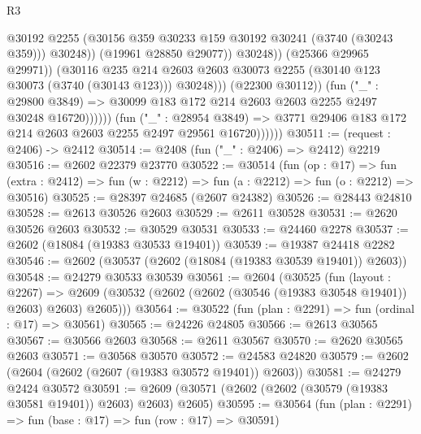 \begin{lexlean}{R3}
\begin{coremodule}
                                          @30192
                                          @2255
                                          (@30156
                                            @359
                                            @30233
                                            @159
                                            @30192
                                            @30241
                                            (@3740 (@30243 @359)))
                                          @30248))
                                      (@19961 @28850 @29077))
                                    @30248))
                                (@25366 @29965 @29971))
                              (@30116
                                @235
                                @214
                                @2603
                                @2603
                                @30073
                                @2255
                                (@30140 @123 @30073 (@3740 (@30143 @123)))
                                @30248)))
                          (@22300 @30112))
                        (fun ("_" : @29800 @3849) =>
                        @30099 @183 @172 @214 @2603 @2603 @2255 @2497 @30248 @16720))))))
              (fun ("_" : @28954 @3849) =>
              @3771 @29406 @183 @172 @214 @2603 @2603 @2255 @2497 @29561 @16720))))))
@30511 := (request : @2406) -> @2412
@30514 := @2408 (fun ("_" : @2406) => @2412) @2219
@30516 := @2602 @22379 @23770
@30522 := @30514
    (fun (op : @17) =>
    fun (extra : @2412) => fun (w : @2212) => fun (a : @2212) => fun (o : @2212) => @30516)
@30525 := @28397 @24685 (@2607 @24382)
@30526 := @28443 @24810
@30528 := @2613 @30526 @2603
@30529 := @2611 @30528
@30531 := @2620 @30526 @2603
@30532 := @30529 @30531
@30533 := @24460 @2278
@30537 := @2602 (@18084 (@19383 @30533 @19401))
@30539 := @19387 @24418 @2282
@30546 := @2602 (@30537 (@2602 (@18084 (@19383 @30539 @19401)) @2603))
@30548 := @24279 @30533 @30539
@30561 := @2604
    (@30525
      (fun (layout : @2267) =>
      @2609 (@30532 (@2602 (@2602 (@30546 (@19383 @30548 @19401)) @2603) @2603) @2605)))
@30564 := @30522 (fun (plan : @2291) => fun (ordinal : @17) => @30561)
@30565 := @24226 @24805
@30566 := @2613 @30565
@30567 := @30566 @2603
@30568 := @2611 @30567
@30570 := @2620 @30565 @2603
@30571 := @30568 @30570
@30572 := @24583 @24820
@30579 := @2602 (@2604 (@2602 (@2607 (@19383 @30572 @19401)) @2603))
@30581 := @24279 @2424 @30572
@30591 := @2609 (@30571 (@2602 (@2602 (@30579 (@19383 @30581 @19401)) @2603) @2603) @2605)
@30595 := @30564 (fun (plan : @2291) => fun (base : @17) => fun (row : @17) => @30591)

\end{coremodule}
\end{lexlean}
